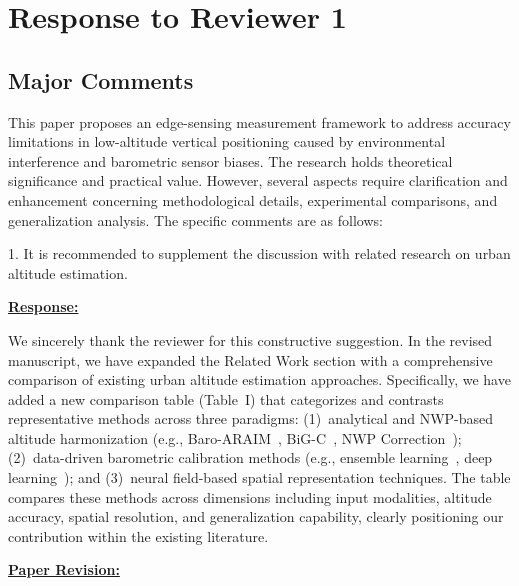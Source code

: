 \newpage
\section{Response to Reviewer 1}

\subsection{Major Comments}

\begin{cmtone}{}{}
This paper proposes an edge-sensing measurement framework to address accuracy limitations in low-altitude vertical positioning caused by environmental interference and barometric sensor biases. The research holds theoretical significance and practical value. However, several aspects require clarification and enhancement concerning methodological details, experimental comparisons, and generalization analysis. The specific comments are as follows:

1. It is recommended to supplement the discussion with related research on urban altitude estimation.

\end{cmtone}

\vspace{0.1cm}
\noindent
\underline{\textbf{Response:}}
\vspace{0.2cm}

We sincerely thank the reviewer for this constructive suggestion. In the revised manuscript, we have expanded the Related Work section with a comprehensive comparison of existing urban altitude estimation approaches. Specifically, we have added a new comparison table (Table~I) that categorizes and contrasts representative methods across three paradigms: (1)~analytical and NWP-based altitude harmonization (e.g., Baro-ARAIM~\cite{simonetti2024geodetic}, BiG-C~\cite{narayanan2022enhanced}, NWP Correction~\cite{schumann2017use}); (2)~data-driven barometric calibration methods (e.g., ensemble learning~\cite{zhang2020urban}, deep learning~\cite{chen2022deep}); and (3)~neural field-based spatial representation techniques. The table compares these methods across dimensions including input modalities, altitude accuracy, spatial resolution, and generalization capability, clearly positioning our contribution within the existing literature.

\vspace{0.1cm}
\noindent
\underline{\textbf{Paper Revision:}}

